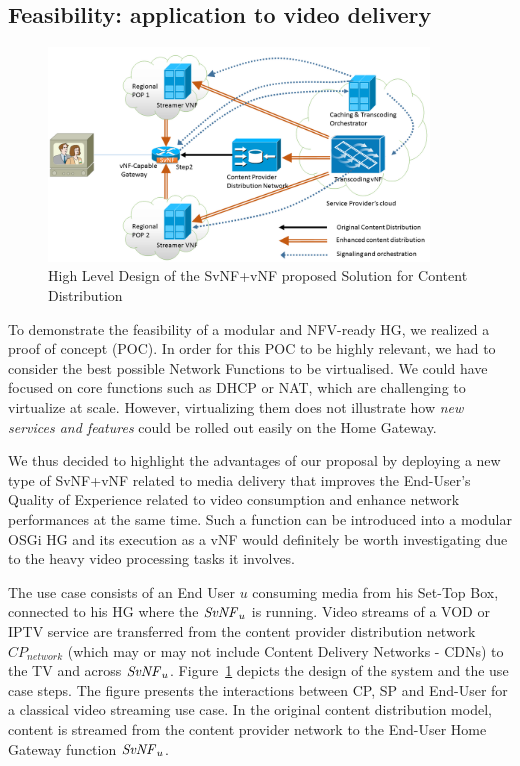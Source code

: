 \subsection{Feasibility: application to video delivery}
\begin{figure}
	\center
	\includegraphics[width=0.90\textwidth,natwidth=8132,natheight=4335]{fig/highleveldesign.png}
	\caption{ High Level Design of the SvNF+vNF proposed Solution for Content Distribution
    \label{fig:hld}
    }
\end{figure}

To demonstrate the feasibility of a modular and NFV-ready HG, we realized a proof of concept (POC).
In order for this POC to be highly relevant, we had to consider the best possible Network Functions to be virtualised.
We could have focused on core functions such as DHCP or NAT, which are challenging to virtualize at scale. However, virtualizing them does not illustrate how \textit{new services and features} could be rolled out easily on the Home Gateway.

We thus decided to highlight the advantages of our proposal by deploying a new type of SvNF+vNF related to media delivery that improves the End-User's Quality of Experience related to video consumption and enhance network performances at the same time.
Such a function can be introduced into a modular OSGi HG and its execution as a vNF would definitely be worth investigating due to the heavy video processing tasks it involves.


The use case consists of an End User $u$ consuming media from his Set-Top Box, connected to his HG where the $\mathit{SvNF}_{u}$ is running.
Video streams of a VOD or IPTV service are transferred from the content provider distribution network \(\mathit{CP}_{\mathit{network}}\) (which may or may not include Content Delivery Networks - CDNs) to the TV and across $\mathit{SvNF}_{u}$.
Figure~\ref{fig:hld} depicts the design of the system and the use case steps. The figure presents the interactions between CP, SP and End-User for a classical video streaming use case.
In the original content distribution model, content is streamed from the content provider network to the End-User Home Gateway function \(\mathit{SvNF}_{u}\).

